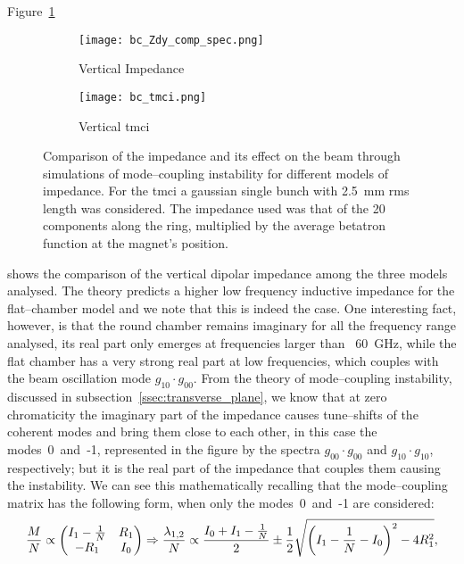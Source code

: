     Figure~\ref{fig:bc_zdy_comp}
    \begin{figure}
        \centering
        \begin{subfigure}[c]{0.48\textwidth}
            \centering
            \texttt{[image: bc\_Zdy\_comp\_spec.png]}
            \caption{Vertical Impedance}
            \label{fig:bc_zdy_comp}
        \end{subfigure}\hfill
        \begin{subfigure}[c]{0.48\textwidth}
            \centering
            \texttt{[image: bc\_tmci.png]}
            \caption{Vertical \gls{tmci}}
            \label{fig:bc_tmci}
        \end{subfigure}
        \caption[Comparison of the vertical dipolar impedance among different models of BC chamber.]{Comparison of the impedance and its effect on the beam through simulations of mode--coupling instability for different models of impedance. For the \gls{tmci} a gaussian single bunch with \SI{2.5}{\milli\meter} \gls{rms} length was considered. The impedance used was that of the 20 components along the ring, multiplied by the average betatron function at the magnet's position.}
        \label{fig:bc_comparisons}
    \end{figure}
     shows the comparison of the vertical dipolar impedance among the three models analysed. The theory predicts a higher low frequency inductive impedance for the flat--chamber model and we note that this is indeed the case. One interesting fact, however, is that the round chamber remains imaginary for all the frequency range analysed, its real part only emerges at frequencies larger than ~\SI{60}{\giga\hertz}, while the flat chamber has a very strong real part at low frequencies, which couples with the beam oscillation mode $g_{10}\cdot g_{00}$. From the theory of mode--coupling instability, discussed in subsection~\ref{ssec:transverse_plane}, we know that at zero chromaticity the imaginary part of the impedance causes tune--shifts of the coherent modes and bring them close to each other, in this case the modes~0~and~-1, represented in the figure by the spectra $g_{00}\cdot g_{00}$ and $g_{10}\cdot g_{10}$, respectively; but it is the real part of the impedance that couples them causing the instability. We can see this mathematically recalling that the mode--coupling matrix has the following form, when only the modes~0~and~-1 are considered:
     \begin{align}\label{eq:bc_eigen_value}
         \frac{M}{N} \propto
         \begin{pmatrix} I_1 -\frac1N & R_1 \\ -R_1 & I_0 \end{pmatrix}
         \Rightarrow
         \frac{\lambda_{1,2}}{N} \propto \frac{I_0 + I_1 -\frac1N}{2} \pm \frac12\sqrt{\left(I_1-\frac1N - I_0\right)^2 - 4R_1^2},
     \end{align}
